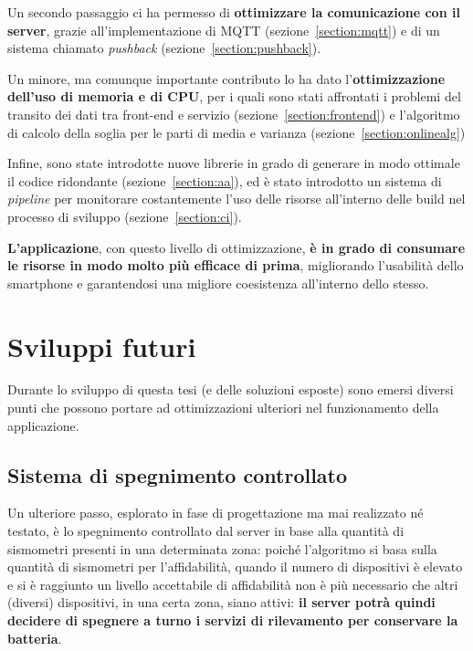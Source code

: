 \documentclass[a4paper,10pt]{memoir}
\begin{document}
\medskip

Un secondo passaggio ci ha permesso di \textbf{ottimizzare la comunicazione con il server}, grazie all'implementazione di MQTT (sezione~\ref{section:mqtt}) e di un sistema chiamato \textit{pushback} (sezione~\ref{section:pushback}).

\medskip

Un minore, ma comunque importante contributo lo ha dato l'\textbf{ottimizzazione dell'uso di memoria e di CPU}, per i quali sono stati affrontati i problemi del transito dei dati tra front-end e servizio (sezione~\ref{section:frontend}) e l'algoritmo di calcolo della soglia per le parti di media e varianza (sezione~\ref{section:onlinealg})

\medskip

Infine, sono state introdotte nuove librerie in grado di generare in modo ottimale il codice ridondante (sezione~\ref{section:aa}), ed è stato introdotto un sistema di \textit{pipeline} per monitorare costantemente l'uso delle risorse all'interno delle build nel processo di sviluppo (sezione~\ref{section:ci}).

\vspace*{1cm}

\textbf{L'applicazione}, con questo livello di ottimizzazione, \textbf{è in grado di consumare le risorse in modo molto più efficace di prima}, migliorando l'usabilità dello smartphone e garantendosi una migliore coesistenza all'interno dello stesso.

\clearpage

\section{Sviluppi futuri}

Durante lo sviluppo di questa tesi (e delle soluzioni esposte) sono emersi diversi punti che possono portare ad ottimizzazioni ulteriori nel funzionamento della applicazione.

\subsection{Sistema di spegnimento controllato}

Un ulteriore passo, esplorato in fase di progettazione ma mai realizzato né testato, è lo spegnimento controllato dal server in base alla quantità di sismometri presenti in una determinata zona: poiché l'algoritmo si basa sulla quantità di sismometri per l'affidabilità, quando il numero di dispositivi è elevato e si è raggiunto un livello accettabile di affidabilità non è più necessario che altri (diversi) dispositivi, in una certa zona, siano attivi: \textbf{il server potrà quindi decidere di spegnere a turno i servizi di rilevamento per conservare la batteria}.
\end{document}
